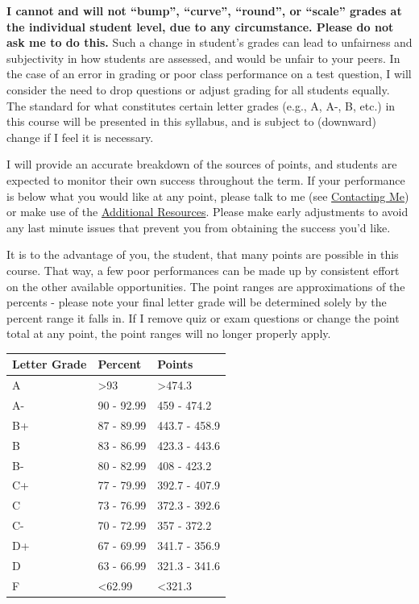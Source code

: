 \documentclass[
  12pt,
  letterpaper,
]{scrartcl}
\begin{document}
\textbf{I cannot and will not ``bump'', ``curve'', ``round'', or
``scale'' grades at the individual student level, due to any
circumstance. Please do not ask me to do this.} Such a change in
student's grades can lead to unfairness and subjectivity in how students
are assessed, and would be unfair to your peers. In the case of an error
in grading or poor class performance on a test question, I will consider
the need to drop questions or adjust grading for all students equally.
The standard for what constitutes certain letter grades (e.g., A, A-, B,
etc.) in this course will be presented in this syllabus, and is subject
to (downward) change if I feel it is necessary.

I will provide an accurate breakdown of the sources of points, and
students are expected to monitor their own success throughout the term.
If your performance is below what you would like at any point, please
talk to me (see \hyperref[contacting-me]{Contacting Me}) or make use of
the \hyperref[additional-resources]{Additional Resources}. Please make
early adjustments to avoid any last minute issues that prevent you from
obtaining the success you'd like.

It is to the advantage of you, the student, that many points are
possible in this course. That way, a few poor performances can be made
up by consistent effort on the other available opportunities. The point
ranges are approximations of the percents - please note your final
letter grade will be determined solely by the percent range it falls in.
If I remove quiz or exam questions or change the point total at any
point, the point ranges will no longer properly apply.

\begin{longtable}[]{@{}lll@{}}
\toprule\noalign{}
Letter Grade & Percent & Points \\
\midrule\noalign{}
\endhead
\bottomrule\noalign{}
\endlastfoot
A & \textgreater93 & \textgreater474.3 \\
A- & 90 - 92.99 & 459 - 474.2 \\
B+ & 87 - 89.99 & 443.7 - 458.9 \\
B & 83 - 86.99 & 423.3 - 443.6 \\
B- & 80 - 82.99 & 408 - 423.2 \\
C+ & 77 - 79.99 & 392.7 - 407.9 \\
C & 73 - 76.99 & 372.3 - 392.6 \\
C- & 70 - 72.99 & 357 - 372.2 \\
D+ & 67 - 69.99 & 341.7 - 356.9 \\
D & 63 - 66.99 & 321.3 - 341.6 \\
F & \textless62.99 & \textless321.3 \\
\end{longtable}
\end{document}
